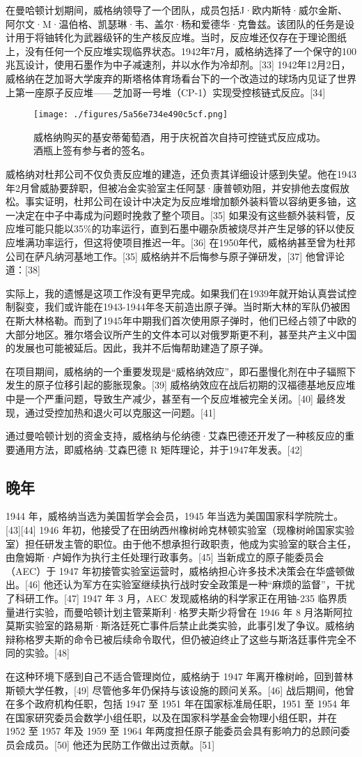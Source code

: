 在曼哈顿计划期间，威格纳领导了一个团队，成员包括J·欧内斯特·威尔金斯、阿尔文·M·温伯格、凯瑟琳·韦、盖尔·杨和爱德华·克鲁兹。该团队的任务是设计用于将铀转化为武器级钚的生产核反应堆。当时，反应堆还仅存在于理论图纸上，没有任何一个反应堆实现临界状态。1942年7月，威格纳选择了一个保守的100兆瓦设计，使用石墨作为中子减速剂，并以水作为冷却剂。[33] 1942年12月2日，威格纳在芝加哥大学废弃的斯塔格体育场看台下的一个改造过的球场内见证了世界上第一座原子反应堆——芝加哥一号堆（CP-1）实现受控核链式反应。[34]
\begin{figure}[ht]
\centering
\texttt{[image: ./figures/5a56e734e490c5cf.png]}
\caption{威格纳购买的基安蒂葡萄酒，用于庆祝首次自持可控链式反应成功。酒瓶上签有参与者的签名。} \label{fig_YJwgn_5}
\end{figure}
威格纳对杜邦公司不仅负责反应堆的建造，还负责其详细设计感到失望。他在1943年2月曾威胁要辞职，但被冶金实验室主任阿瑟·康普顿劝阻，并安排他去度假放松。事实证明，杜邦公司在设计中决定为反应堆增加额外装料管以容纳更多铀，这一决定在中子中毒成为问题时挽救了整个项目。[35] 如果没有这些额外装料管，反应堆可能只能以35\%的功率运行，直到石墨中硼杂质被烧尽并产生足够的钚以使反应堆满功率运行，但这将使项目推迟一年。[36] 在1950年代，威格纳甚至曾为杜邦公司在萨凡纳河基地工作。[35] 威格纳并不后悔参与原子弹研发，[37] 他曾评论道：[38]

实际上，我的遗憾是这项工作没有更早完成。如果我们在1939年就开始认真尝试控制裂变，我们或许能在1943-1944年冬天前造出原子弹。当时斯大林的军队仍被困在斯大林格勒。而到了1945年中期我们首次使用原子弹时，他们已经占领了中欧的大部分地区。雅尔塔会议所产生的文件本可以对俄罗斯更不利，甚至共产主义中国的发展也可能被延后。因此，我并不后悔帮助建造了原子弹。

在项目期间，威格纳的一个重要发现是“威格纳效应”，即石墨慢化剂在中子辐照下发生的原子位移引起的膨胀现象。[39] 威格纳效应在战后初期的汉福德基地反应堆中是一个严重问题，导致生产减少，甚至有一个反应堆被完全关闭。[40] 最终发现，通过受控加热和退火可以克服这一问题。[41]

通过曼哈顿计划的资金支持，威格纳与伦纳德·艾森巴德还开发了一种核反应的重要通用方法，即威格纳–艾森巴德 R 矩阵理论，并于1947年发表。[42]
\subsection{晚年}
1944 年，威格纳当选为美国哲学会会员，1945 年当选为美国国家科学院院士。[43][44] 1946 年初，他接受了在田纳西州橡树岭克林顿实验室（现橡树岭国家实验室）担任研发主管的职位。由于他不想承担行政职责，他成为实验室的联合主任，由詹姆斯·卢姆作为执行主任处理行政事务。[45] 当新成立的原子能委员会（AEC）于 1947 年初接管实验室运营时，威格纳担心许多技术决策会在华盛顿做出。[46] 他还认为军方在实验室继续执行战时安全政策是一种“麻烦的监督”，干扰了科研工作。[47] 1947 年 3 月，AEC 发现威格纳的科学家正在用铀-235 临界质量进行实验，而曼哈顿计划主管莱斯利·格罗夫斯少将曾在 1946 年 8 月洛斯阿拉莫斯实验室的路易斯·斯洛廷死亡事件后禁止此类实验，此事引发了争议。威格纳辩称格罗夫斯的命令已被后续命令取代，但仍被迫终止了这些与斯洛廷事件完全不同的实验。[48]

在这种环境下感到自己不适合管理岗位，威格纳于 1947 年离开橡树岭，回到普林斯顿大学任教，[49] 尽管他多年仍保持与该设施的顾问关系。[46] 战后期间，他曾在多个政府机构任职，包括 1947 至 1951 年在国家标准局任职，1951 至 1954 年在国家研究委员会数学小组任职，以及在国家科学基金会物理小组任职，并在 1952 至 1957 年及 1959 至 1964 年两度担任原子能委员会具有影响力的总顾问委员会成员。[50] 他还为民防工作做出过贡献。[51]
